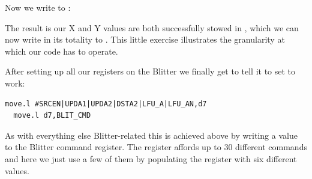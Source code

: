 \vspace{-0.5cm}
Now we write  to : 
\begin{figure}[H]
  {
    \setlength{\tabcolsep}{3.0pt}
    \setlength\cmidrulewidth{\lightrulewidth} %
    \begin{adjustbox}{width=3cm,center}
    \end{adjustbox}
  }
\end{figure}
\vspace{-0.5cm}
 The result is our X and Y values are both successfully stowed in , which we can now write in its totality to
. This little exercise illustrates the granularity at which our code has to operate. 

After setting up all our registers on the Blitter we finally get to tell it to set to work:

\begin{lstlisting}[escapechar=\%]
  move.l #SRCEN|UPDA1|UPDA2|DSTA2|LFU_A|LFU_AN,d7
  move.l d7,BLIT_CMD
\end{lstlisting}

As with everything else Blitter-related this is achieved above by writing a value to the Blitter command register. The register
affords up to 30 different commands and here we just use a few of them by populating the register with six different values.

